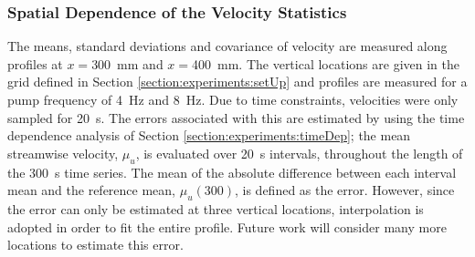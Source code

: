 \documentclass[12pt,oneside,a4paper]{article}
\begin{document}
\subsubsection{Spatial Dependence of the Velocity Statistics}
\label{section:experiments:profiles}
The means, standard deviations and covariance of velocity are measured along profiles at $x=$\SI{300}{mm} and $x=$\SI{400}{mm}. The vertical locations are given in the grid defined in Section \ref{section:experiments:setUp} and profiles are measured for a pump frequency of \SI{4}{Hz} and \SI{8}{Hz}. Due to time constraints, velocities were only sampled for \SI{20}{s}. The errors associated with this are estimated by using the time dependence analysis of Section \ref{section:experiments:timeDep}; the mean streamwise velocity, $\mu_u$, is evaluated over \SI{20}{s} intervals, throughout the length of the \SI{300}{s} time series. The mean of the absolute difference between each interval mean and the reference mean, $\mu_u(300)$, is defined as the error. However, since the error can only be estimated at three vertical locations, interpolation is adopted in order to fit the entire profile. Future work will consider many more locations to estimate this error. 
\end{document}

